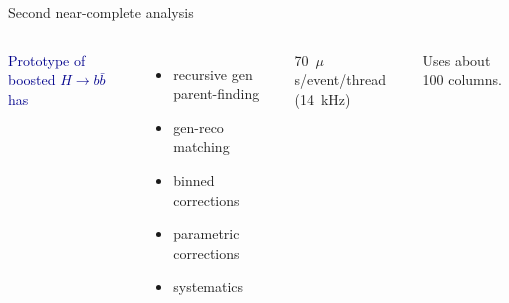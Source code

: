 \documentclass[aspectratio=169]{beamer}
\begin{document}
\begin{frame}{Second near-complete analysis}
\vspace{0.5 cm}
\begin{columns}[t]
\textcolor{darkblue}{Prototype of boosted $H \to b\bar{b}$ has}
\begin{itemize}
\item recursive gen parent-finding
\item gen-reco matching
\item binned corrections
\item parametric corrections
\item systematics
\end{itemize}

\large
\vspace{0.25 cm}
70~$\mu$s/event/thread (14~kHz)

\vspace{0.25 cm}
Uses about 100 columns.
\end{columns}
\end{frame}
\end{document}
